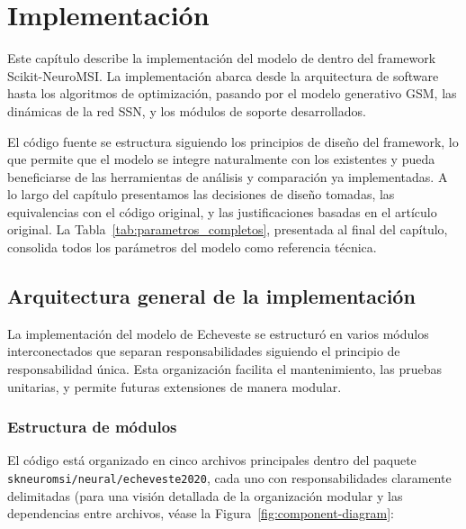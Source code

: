 \chapter{Implementación}
\label{chapter:implementacion}

Este capítulo describe la implementación del modelo de \citeauthor{echeveste2020cortical} dentro del framework Scikit-NeuroMSI. La implementación abarca desde la arquitectura de software hasta los algoritmos de optimización, pasando por el modelo generativo \acrshort{GSM}, las dinámicas de la red \acrshort{SSN}, y los módulos de soporte desarrollados.

El código fuente se estructura siguiendo los principios de diseño del framework, lo que permite que el modelo se integre naturalmente con los existentes y pueda beneficiarse de las herramientas de análisis y comparación ya implementadas. A lo largo del capítulo presentamos las decisiones de diseño tomadas, las equivalencias con el código original, y las justificaciones basadas en el artículo original. La Tabla~\ref{tab:parametros_completos}, presentada al final del capítulo, consolida todos los parámetros del modelo como referencia técnica.


\section{Arquitectura general de la implementación}
\label{sec:impl_arquitectura}

La implementación del modelo de Echeveste se estructuró en varios módulos interconectados que separan responsabilidades siguiendo el principio de responsabilidad única. Esta organización facilita el mantenimiento, las pruebas unitarias, y permite futuras extensiones de manera modular.

\subsection{Estructura de módulos}
\label{subsec:impl_modulos}

El código está organizado en cinco archivos principales dentro del paquete \texttt{skneuromsi/\-neural/\-echeveste2020}, cada uno con responsabilidades claramente delimitadas (para una visión detallada de la organización modular y las dependencias entre archivos, véase la Figura~\ref{fig:component-diagram}:

